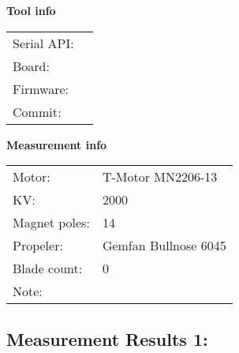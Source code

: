 \documentclass[10pt]{article}
\begin{document}
\noindent
{\large \bf Tool info}
\vspace{3mm}

\noindent
\begin{tabular}{ll}
Serial API:  & \\ 
Board:       & \\ 
Firmware:    & \\ 
Commit:      & 
\end{tabular}
\vspace{3mm}

\noindent
{\large \bf Measurement info}
\vspace{3mm}

\noindent
\begin{tabular}{ll}
Motor:        & T-Motor MN2206-13\\ 
KV:           & 2000\\ 
Magnet poles: & 14\\ 
Propeler:     & Gemfan Bullnose 6045\\ 
Blade count:  & 0\\ 
Note:         & 
\end{tabular}

\vspace{3mm}


\subsection*{\large \bf Measurement Results 1:}
\end{document}
